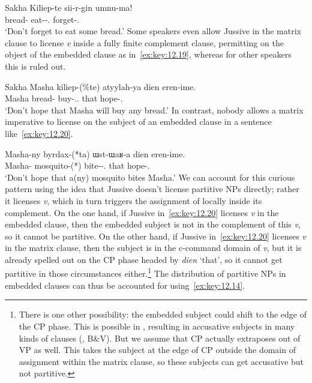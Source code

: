 \documentclass[output=paper]{langsci/langscibook}
\begin{document}
\ea\label{ex:key:12.18}Sakha
    \sn
	\gll Kiliep-te  sii-r-gin  umnu-ma!\\
		bread-\Part{}  eat-\Aor{}-\Ssg{}.\Acc{}  forget-\Neg{}.\Imp{}\\
	\glt ‘Don’t forget to eat some bread.’
\z
Some speakers even allow Jussive in the matrix clause to license \emph{v}\textsubscript{\Imp} inside a fully finite complement clause, permitting  on the object of the embedded clause as in~\eqref{ex:key:12.19}, whereas for other speakers this is ruled out.

\ea\label{ex:key:12.19}Sakha
    \sn
	\gll Masha  kiliep-(\%te) atyylah-ya dien eren-ime.\\
		Masha  bread-\Part{}  buy-\Fut{}.\Tsg.\Sbj{}  that  hope-\Neg{}.\Imp{}\\
	\glt ‘Don’t hope that Masha will buy any bread.’
\z
In contrast, nobody allows a matrix imperative to license  on the subject of an embedded clause in a sentence like~\eqref{ex:key:12.20}.

\ea\label{ex:key:12.20}
    \sn
	\gll Masha-ny   byrdax-(*ta)         ɯst-ɯaʁ-a    dien  eren-ime.\\
		Masha-\Acc{}  mosquito-(*\Part{})  bite-\Fut{}-\Tsg.\Sbj{}  that    hope-\Neg{}.\Imp{}\\
	\glt ‘Don’t hope that a(ny) mosquito bites Masha.’
\z
We can account for this curious pattern using the idea that Jussive doesn’t
license partitive NPs directly; rather it licenses
\emph{v}\textsubscript{\Imp}, which in turn triggers the assignment of
 locally inside its complement. On the one hand, if Jussive
in~\eqref{ex:key:12.20} licenses \emph{v}\textsubscript{\Imp} in the embedded
clause, then the embedded subject is not in the complement of this
\emph{v}\textsubscript{\Imp}, so it cannot be partitive. On the other hand, if
Jussive in~\eqref{ex:key:12.20} licenses \emph{v}\textsubscript{\Imp} in the
matrix clause, then the subject is in the c-command domain of
\emph{v}\textsubscript{\Imp}, but it is already spelled out on the CP
phase headed by \emph{dien} ‘that’, so it cannot get partitive in
those circumstances either.\footnote{There is one other possibility: the
    embedded subject could shift to the edge of the CP phase. This
    is possible in , resulting in accusative subjects in many kinds
    of clauses (\citealt{Vinokurova2005}, B\&V). But we assume that CP actually
    extraposes out of VP as well.  This takes the subject at the edge of CP
outside the domain of  assignment within the matrix clause,
so these subjects can get accusative but not partitive.\label{fn:12.8}}  The
distribution of partitive NPs in embedded clauses can thus be accounted for
using~\eqref{ex:key:12.14}.
\end{document}
